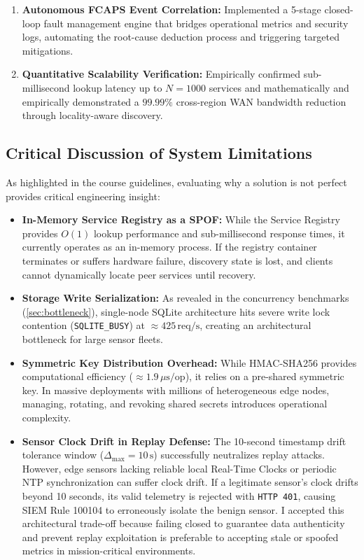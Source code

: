 \begin{enumerate}
\begin{itemize}
    \end{itemize}
    \item \textbf{Autonomous FCAPS Event Correlation:} Implemented a 5-stage closed-loop fault management engine that bridges operational metrics and security logs, automating the root-cause deduction process and triggering targeted mitigations.
    \item \textbf{Quantitative Scalability Verification:} Empirically confirmed sub-millisecond lookup latency up to $N = 1000$ services and mathematically and empirically demonstrated a $99.99\%$ cross-region WAN bandwidth reduction through locality-aware discovery.
\end{enumerate}

\subsection{Critical Discussion of System Limitations}
As highlighted in the course guidelines, evaluating why a solution is not perfect provides critical engineering insight:
\begin{itemize}
    \item \textbf{In-Memory Service Registry as a SPOF:} While the Service Registry provides $O(1)$ lookup performance and sub-millisecond response times, it currently operates as an in-memory process. If the registry container terminates or suffers hardware failure, discovery state is lost, and clients cannot dynamically locate peer services until recovery.
    \item \textbf{Storage Write Serialization:} As revealed in the concurrency benchmarks (\cref{sec:bottleneck}), single-node SQLite architecture hits severe write lock contention (\texttt{SQLITE\_BUSY}) at $\approx 425\,\text{req/s}$, creating an architectural bottleneck for large sensor fleets.
    \item \textbf{Symmetric Key Distribution Overhead:} While HMAC-SHA256 provides computational efficiency ($\approx 1.9\,\mu\text{s/op}$), it relies on a pre-shared symmetric key. In massive deployments with millions of heterogeneous edge nodes, managing, rotating, and revoking shared secrets introduces operational complexity.
    \item \textbf{Sensor Clock Drift in Replay Defense:} The 10-second timestamp drift tolerance window ($\Delta_{\max} = 10\,\text{s}$) successfully neutralizes replay attacks. However, edge sensors lacking reliable local Real-Time Clocks or periodic NTP synchronization can suffer clock drift. If a legitimate sensor's clock drifts beyond 10 seconds, its valid telemetry is rejected with \texttt{HTTP 401}, causing SIEM Rule 100104 to erroneously isolate the benign sensor. I accepted this architectural trade-off because failing closed to guarantee data authenticity and prevent replay exploitation is preferable to accepting stale or spoofed metrics in mission-critical environments.
\end{itemize}


